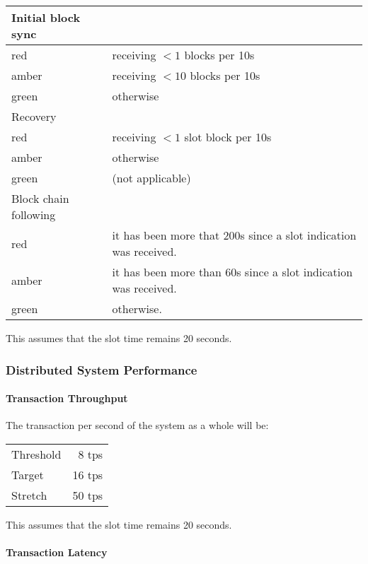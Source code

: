 \documentclass{report}
\theoremstyle{definition}{
  \newtheorem{lemma}{Lemma}[section] %
  \newtheorem{definition}[lemma]{Definition}
}
\theoremstyle{theorem}{
  \newtheorem{invariant}[lemma]{Invariant}
  \newtheorem{proofobligation}[lemma]{Proof Obligation}
}
\numberwithin{equation}{lemma}
\begin{document}
%
\begin{center}
\begin{tabular}{ll}
Initial block sync \\
\hline
red   & receiving $<1$ blocks per 10s \\
amber & receiving $<10$ blocks per 10s \\
green & otherwise  \\[1em]

Recovery \\
\hline
red   & receiving $<1$ slot block per 10s \\
amber & otherwise  \\
green & (not applicable) \\[1em]

Block chain following \\
\hline
red   & it has been more that 200s since a slot indication was received. \\
amber & it has been more than 60s since a slot indication was received. \\
green & otherwise.
\end{tabular}
\end{center}

This assumes that the slot time remains 20 seconds.


\subsubsection{Distributed System Performance}

\paragraph{Transaction Throughput}

The transaction per second of the system as a whole will be:
%
\begin{center}
\begin{tabular}{lr}
Threshold &  8 tps  \\
Target    & 16 tps  \\
Stretch   & 50 tps  \\
\end{tabular}
\end{center}

This assumes that the slot time remains 20 seconds.

\paragraph{Transaction Latency}
\end{document}

